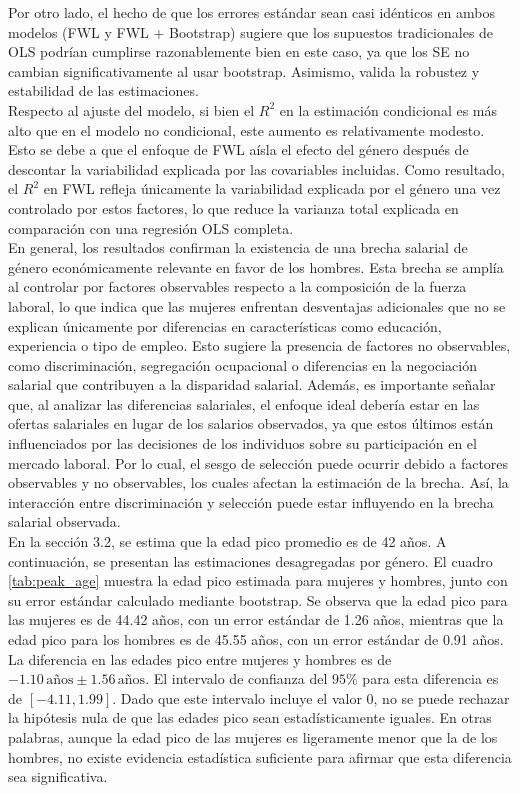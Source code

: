 \documentclass[12pt,a4paper,onecolumn]{article}
\begin{document}
Por otro lado, el hecho de que los errores estándar sean casi idénticos en ambos modelos (FWL y FWL + Bootstrap) sugiere que los supuestos tradicionales de OLS podrían cumplirse razonablemente bien en este caso, ya que los SE no cambian significativamente al usar bootstrap. Asimismo, valida la robustez y estabilidad de las estimaciones. \\

Respecto al ajuste del modelo, si bien el $R^2$ en la estimación condicional es más alto que en el modelo no condicional, este aumento es relativamente modesto. Esto se debe a que el enfoque de FWL aísla el efecto del género después de descontar la variabilidad explicada por las covariables incluidas. Como resultado, el $R^2$ en FWL refleja únicamente la variabilidad explicada por el género una vez controlado por estos factores, lo que reduce la varianza total explicada en comparación con una regresión OLS completa. \\

En general, los resultados confirman la existencia de una brecha salarial de género económicamente relevante en favor de los hombres. Esta brecha se amplía al controlar por factores observables respecto a la composición de la fuerza laboral, lo que indica que las mujeres enfrentan desventajas adicionales que no se explican únicamente por diferencias en características como educación, experiencia o tipo de empleo. Esto sugiere la presencia de factores no observables, como discriminación, segregación ocupacional o diferencias en la negociación salarial que contribuyen a la disparidad salarial. Además, es importante señalar que, al analizar las diferencias salariales, el enfoque ideal debería estar en las ofertas salariales en lugar de los salarios observados, ya que estos últimos están influenciados por las decisiones de los individuos sobre su participación en el mercado laboral. Por lo cual, el sesgo de selección puede ocurrir debido a factores observables y no observables, los cuales afectan la estimación de la brecha. Así, la interacción entre discriminación y selección puede estar influyendo en la brecha salarial observada. \\

En la sección 3.2, se estima que la edad pico promedio es de 42 años. A continuación, se presentan las estimaciones desagregadas por género. El cuadro \ref{tab:peak_age} muestra la edad pico estimada para mujeres y hombres, junto con su error estándar calculado mediante bootstrap. Se observa que la edad pico para las mujeres es de 44.42 años, con un error estándar de 1.26 años, mientras que la edad pico para los hombres es de 45.55 años, con un error estándar de 0.91 años. La diferencia en las edades pico entre mujeres y hombres es de $-1.10 \, \text{años} \pm 1.56 \, \text{años}$. El intervalo de confianza del $95\%$ para esta diferencia es de $[-4.11, 1.99]$. Dado que este intervalo incluye el valor 0, no se puede rechazar la hipótesis nula de que las edades pico sean estadísticamente iguales. En otras palabras, aunque la edad pico de las mujeres es ligeramente menor que la de los hombres, no existe evidencia estadística suficiente para afirmar que esta diferencia sea significativa.
\end{document}
